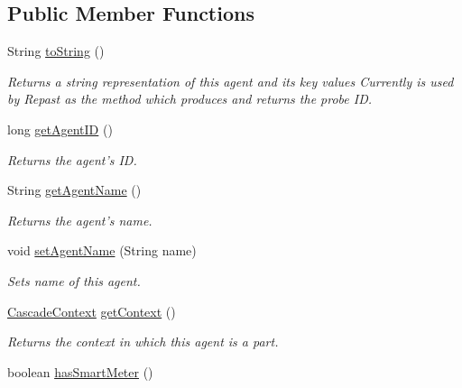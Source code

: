 \subsection*{Public Member Functions}
\begin{DoxyCompactItemize}
\item 
String \hyperlink{classuk_1_1ac_1_1dmu_1_1iesd_1_1cascade_1_1agents_1_1prosumers_1_1_prosumer_agent_aae9ac4dd2ebbb928f7dea0c2b0953dba}{to\-String} ()
\begin{DoxyCompactList}\small\item\em Returns a string representation of this agent and its key values Currently is used by Repast as the method which produces and returns the probe I\-D. \end{DoxyCompactList}\item 
long \hyperlink{classuk_1_1ac_1_1dmu_1_1iesd_1_1cascade_1_1agents_1_1prosumers_1_1_prosumer_agent_a2cd2c90197d569e71ccf5cbfe562b1b8}{get\-Agent\-I\-D} ()
\begin{DoxyCompactList}\small\item\em Returns the agent's I\-D. \end{DoxyCompactList}\item 
String \hyperlink{classuk_1_1ac_1_1dmu_1_1iesd_1_1cascade_1_1agents_1_1prosumers_1_1_prosumer_agent_ae88127f0dac9ba97823b974934e8595a}{get\-Agent\-Name} ()
\begin{DoxyCompactList}\small\item\em Returns the agent's name. \end{DoxyCompactList}\item 
void \hyperlink{classuk_1_1ac_1_1dmu_1_1iesd_1_1cascade_1_1agents_1_1prosumers_1_1_prosumer_agent_a240212ecf3a1883def44a98a3ef16ec7}{set\-Agent\-Name} (String name)
\begin{DoxyCompactList}\small\item\em Sets name of this agent. \end{DoxyCompactList}\item 
\hyperlink{classuk_1_1ac_1_1dmu_1_1iesd_1_1cascade_1_1context_1_1_cascade_context}{Cascade\-Context} \hyperlink{classuk_1_1ac_1_1dmu_1_1iesd_1_1cascade_1_1agents_1_1prosumers_1_1_prosumer_agent_a1409ba2c8b5f7e96ae261136a81070b9}{get\-Context} ()
\begin{DoxyCompactList}\small\item\em Returns the context in which this agent is a part. \end{DoxyCompactList}\item 
boolean \hyperlink{classuk_1_1ac_1_1dmu_1_1iesd_1_1cascade_1_1agents_1_1prosumers_1_1_prosumer_agent_ab3ce44374f63d0e3ee06e032bbd89d3d}{has\-Smart\-Meter} ()

\end{DoxyCompactItemize}
